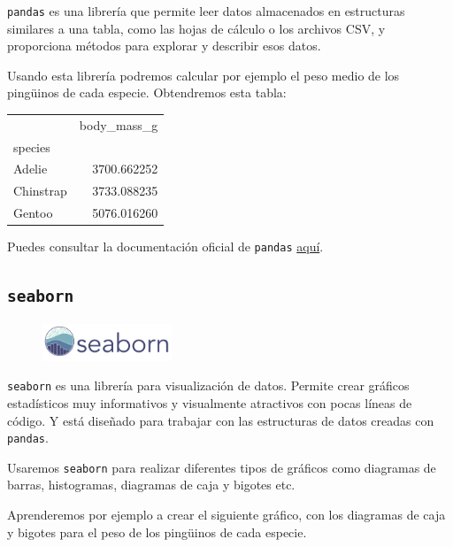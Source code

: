\documentclass[
  a4paper,
  noprof,
  12pt,
  notoc,
  nosols,
  nobib]{mnye}
\theoremstyle{definition}
\theoremstyle{remark}
\begin{document}
\texttt{pandas} es una librería que permite leer datos almacenados en
estructuras similares a una tabla, como las hojas de cálculo o los
archivos CSV, y proporciona métodos para explorar y describir esos
datos.

Usando esta librería podremos calcular por ejemplo el peso medio de los
pingüinos de cada especie. Obtendremos esta tabla:

\begin{tabular}{lr}
\toprule
{} &  body\_mass\_g \\
species   &              \\
\midrule
Adelie    &  3700.662252 \\
Chinstrap &  3733.088235 \\
Gentoo    &  5076.016260 \\
\bottomrule
\end{tabular}

Puedes consultar la documentación oficial de \texttt{pandas}
\href{https://pandas.pydata.org/docs/index.html}{aquí}.

\hypertarget{seaborn}{%
\subsection{\texorpdfstring{\texttt{seaborn}}{seaborn}}\label{seaborn}}

\begin{figure}[tbph]

{\centering \includegraphics[width=\textwidth,height=3em]{chapters/../img/seaborn.png}

}

\end{figure}

\texttt{seaborn} es una librería para visualización de datos. Permite
crear gráficos estadísticos muy informativos y visualmente atractivos
con pocas líneas de código. Y está diseñado para trabajar con las
estructuras de datos creadas con \texttt{pandas}.

Usaremos \texttt{seaborn} para realizar diferentes tipos de gráficos
como diagramas de barras, histogramas, diagramas de caja y bigotes etc.

Aprenderemos por ejemplo a crear el siguiente gráfico, con los diagramas
de caja y bigotes para el peso de los pingüinos de cada especie.
\end{document}
